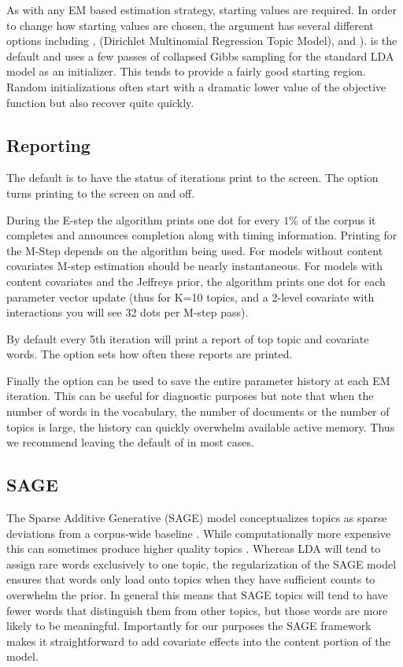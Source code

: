 \documentclass[nojss]{jss}
\begin{document}
As with any EM based estimation strategy, starting values are required. In order to change how starting values are chosen, the argument  has several different options including ,  (Dirichlet Multinomial Regression Topic Model), and ).
 is the default and uses a few passes of collapsed Gibbs sampling for the standard LDA model as an initializer.  This tends to provide a fairly good starting region.  Random initializations often start with a dramatic lower value of the objective function but also recover quite quickly.

\subsection{Reporting}
The default is to have the status of iterations print to the screen. The  option turns printing to the screen on and off.

During the E-step the algorithm prints one dot for every $1\%$ of the corpus it completes and announces completion along with timing information.  Printing for the M-Step depends on the algorithm being used.  For models without content covariates M-step estimation should be nearly instantaneous.  For models with content covariates and the Jeffreys prior, the algorithm prints one dot for each parameter vector update (thus for K=10 topics, and a 2-level covariate with interactions you will see 32 dots per M-step pass).

By default every 5th iteration will print a report of top topic and covariate words.  The  option sets how often these reports are printed.

Finally the  option can be used to save the entire parameter history at each EM iteration.  This can be useful for diagnostic purposes but note that when the number of words in the vocabulary, the number of documents or the number of topics is large, the history can quickly overwhelm available active memory. Thus we recommend leaving the default of  in most cases.

\subsection{SAGE}
The Sparse Additive Generative (SAGE) model conceptualizes topics as sparse deviations from a corpus-wide baseline \citep{eisenstein2011sparse}.  While computationally more expensive this can sometimes produce higher quality topics .  Whereas LDA will tend to assign rare words exclusively to one topic, the regularization of the SAGE model ensures that words only load onto topics when they have sufficient counts to overwhelm the prior.  In general this means that SAGE topics will tend to have fewer words that distinguish them from other topics, but those words are more likely to be meaningful.  Importantly for our purposes the SAGE framework makes it straightforward to add covariate effects into the content portion of the model.
\end{document}
